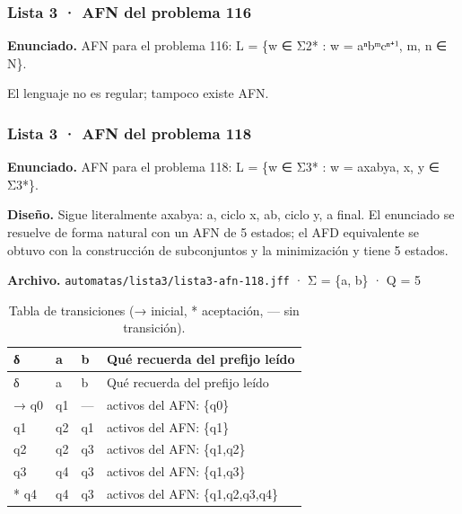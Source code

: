 
\hypertarget{lista-3-afn-del-problema-116}{%
\subsubsection{Lista 3 · AFN del problema 116}\label{lista-3-afn-del-problema-116}}

\textbf{Enunciado.} AFN para el problema 116: L = \{w ∈ Σ2* : w = aⁿbᵐcⁿ⁺¹, m, n ∈ N\}.

El lenguaje no es regular; tampoco existe AFN.

\hypertarget{lista-3-afn-del-problema-118}{%
\subsubsection{Lista 3 · AFN del problema 118}\label{lista-3-afn-del-problema-118}}

\textbf{Enunciado.} AFN para el problema 118: L = \{w ∈ Σ3* : w = axabya, x, y ∈ Σ3*\}.

\textbf{Diseño.} Sigue literalmente axabya: a, ciclo x, ab, ciclo y, a final. El enunciado se resuelve de forma natural con un AFN de 5 estados; el AFD equivalente se obtuvo con la construcción de subconjuntos y la minimización y tiene 5 estados.

\textbf{Archivo.} \texttt{automatas/lista3/lista3-afn-118.jff} · Σ = \{a, b\} · \textbar Q\textbar{} = 5

\begin{longtable}[]{@{}llll@{}}
\caption{Tabla de transiciones (→ inicial, * aceptación, --- sin transición).}\tabularnewline
\toprule\noalign{}
δ & a & b & Qué recuerda del prefijo leído \\
\midrule\noalign{}
\endfirsthead
\toprule\noalign{}
δ & a & b & Qué recuerda del prefijo leído \\
\midrule\noalign{}
\endhead
\bottomrule\noalign{}
\endlastfoot
→ q0 & q1 & --- & activos del AFN: \{q0\} \\
q1 & q2 & q1 & activos del AFN: \{q1\} \\
q2 & q2 & q3 & activos del AFN: \{q1,q2\} \\
q3 & q4 & q3 & activos del AFN: \{q1,q3\} \\
* q4 & q4 & q3 & activos del AFN: \{q1,q2,q3,q4\} \\
\end{longtable}


